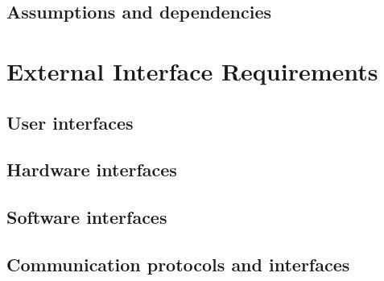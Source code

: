\documentclass[10pt]{article}
\begin{document}
\lipsum[10]

\subsection{Assumptions and dependencies}

\lipsum[10]








\section{External Interface Requirements} 

\subsection{User interfaces}

\lipsum[10]

\subsection{Hardware interfaces}

\lipsum[10]

\subsection{Software interfaces}

\lipsum[10]

\subsection{Communication protocols and interfaces}

\lipsum[10]








\end{document}
